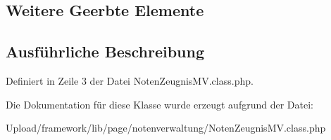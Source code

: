 \subsection*{Weitere Geerbte Elemente}


\subsection{Ausführliche Beschreibung}


Definiert in Zeile 3 der Datei Noten\+Zeugnis\+M\+V.\+class.\+php.



Die Dokumentation für diese Klasse wurde erzeugt aufgrund der Datei\+:\begin{DoxyCompactItemize}
\item 
Upload/framework/lib/page/notenverwaltung/Noten\+Zeugnis\+M\+V.\+class.\+php\end{DoxyCompactItemize}
